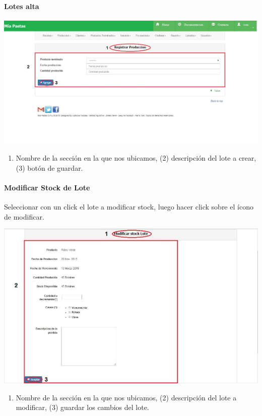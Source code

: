 \documentclass[letterpaper,10pt,english]{sphinxmanual}
\begin{document}
\paragraph{{}Lotes alta}
\label{lotes alta::doc}\label{lotes alta:lotes-alta}
\includegraphics{lotes_alta.jpg}
\begin{enumerate}
\item {} 
Nombre de la sección en la que nos ubicamos, (2) descripción del lote a crear, (3) botón de guardar.

\end{enumerate}


\paragraph{{}Modificar Stock de Lote}
\label{productosTerminadosActualizarStock consultar::doc}\label{productosTerminadosActualizarStock consultar:modificar-stock-de-lote}
Seleccionar con un click el lote a modificar stock, luego hacer click sobre el ícono de modificar.

\includegraphics{lotes_modificar.jpg}
\begin{enumerate}
\item {} 
Nombre de la sección en la que nos ubicamos, (2) descripción del lote a modificar, (3) guardar los cambios del lote.

\end{enumerate}
\end{document}
